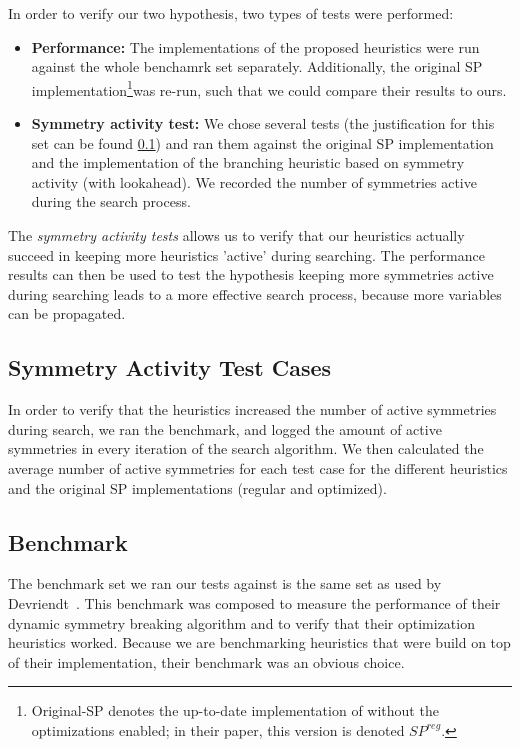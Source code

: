 
In order to verify our two hypothesis, two types of tests were performed:

\begin{itemize}
	\item {\bf Performance:}
		The implementations of the proposed heuristics were run against the whole
		benchamrk set separately.
		Additionally, the original SP implementation\footnote{
			Original-SP denotes the up-to-date implementation of \cite{devriendt2012symmetry}
			without the optimizations enabled; in their paper, this version is denoted $SP^{reg}$.
		}was re-run, such that we could compare their results to ours.

	\item {\bf Symmetry activity test:}
		We chose several tests (the justification for this set can be found
		\ref{ssec:sym_act_test_cases}) and ran them against the original SP implementation and the
		implementation of the branching heuristic based on symmetry activity (with lookahead).
		We recorded the number of symmetries active during the search process.

\end{itemize}

The \emph{symmetry activity tests} allows us to verify that our heuristics actually succeed in
keeping more heuristics 'active' during searching.
The performance results can then be used to test the hypothesis
keeping more symmetries active during searching leads to a more effective search process,
because more variables can be propagated.

\subsection{Symmetry Activity Test Cases}
\label{ssec:sym_act_test_cases}
	In order to verify that the heuristics increased the number of active symmetries during search,
	we ran the benchmark, and logged the amount of active symmetries in every iteration of the
	search algorithm.
	We then calculated the average number of active symmetries for each test case for the different
	heuristics and the original SP implementations (regular and optimized).

\subsection{Benchmark}
\label{ssec:benchmark}
	The benchmark set we ran our tests against is the same set as used by Devriendt~\cite{devriendt2012symmetry}.
	This benchmark was composed to measure the performance of their dynamic symmetry
	breaking algorithm and to verify that their optimization heuristics worked.
	Because we are benchmarking heuristics that were build on top of their implementation, their
	benchmark was an obvious choice.

